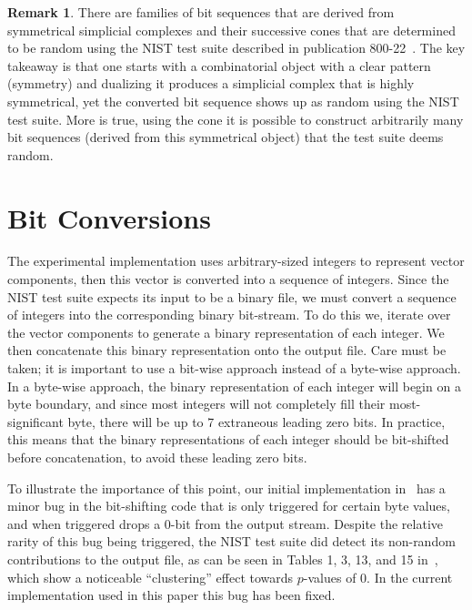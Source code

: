 \documentclass[oneside,12pt]{amsart}
\theoremstyle{definition}
\newtheorem{Remark}[Theorem]{Remark}
\numberwithin{equation}{section}
\begin{document}
\begin{Remark}
There are families of bit sequences that are derived from symmetrical simplicial complexes and their successive cones that are determined to be random using the NIST test suite described in publication 800-22~\cite{NIST}.
The key takeaway is that one starts with a combinatorial object with a clear pattern (symmetry) and dualizing it produces a simplicial complex that is highly symmetrical, yet the converted bit sequence shows up as random using the NIST test suite.
More is true, using the cone it is possible to construct arbitrarily many bit sequences (derived from this symmetrical object) that the test suite deems random.
\end{Remark}

\section{Bit Conversions} \label{bitconversions}

The experimental implementation uses arbitrary-sized integers to represent vector components, then this vector is converted into a sequence of integers.
Since the NIST test suite \cite{NIST} expects its input to be a binary file, we must convert a sequence of integers into the corresponding binary bit-stream.
To do this we, iterate over the vector components to generate a binary representation of each integer.  We then concatenate this binary representation onto the output file.  Care must be taken; it is important to use a bit-wise approach instead of a byte-wise approach.  In a byte-wise approach, the binary representation of each integer will begin on a byte boundary, and since most integers will not completely fill their most-significant byte, there will be up to 7 extraneous leading zero bits.  In practice, this means that the binary representations of each integer should be bit-shifted before concatenation, to avoid these leading zero bits.

To illustrate the importance of this point, our initial implementation in~\cite{ALDH} has a minor bug in the bit-shifting code that is only triggered for certain byte values, and when triggered drops a 0-bit from the output stream.
Despite the relative rarity of this bug being triggered, the NIST test suite did detect its non-random contributions to the output file, as can be seen in Tables 1, 3, 13, and 15 in~\cite{ALDH}, which show a noticeable ``clustering'' effect towards $p$-values of 0.
In the current implementation used in this paper this bug has been fixed.
\end{document}
